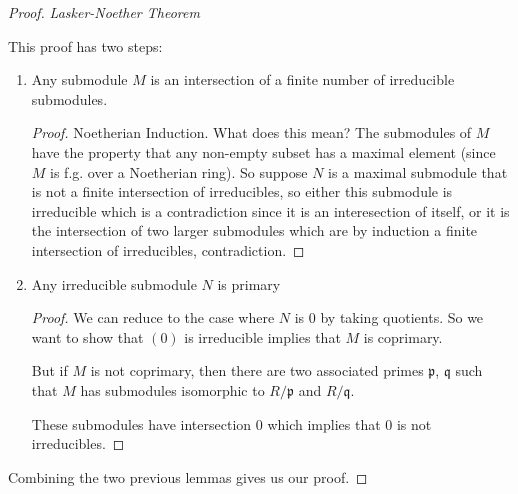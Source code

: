 \begin{proof}\textit{Lasker-Noether Theorem}
    
    This proof has two steps:\begin{enumerate}
        \item \begin{lemma}
            Any submodule $M$ is an intersection of a finite number of irreducible submodules.

            \begin{proof}
                Noetherian Induction. What does this mean? The submodules of $M$ have the property that any non-empty subset has a maximal element (since $M$ is f.g.  over a Noetherian ring).
            So suppose $N$ is a maximal submodule that is not a finite intersection of irreducibles, so either this submodule is irreducible which is a contradiction since it is an interesection of itself, or it is the intersection of two larger submodules which are by induction a finite intersection of irreducibles, contradiction.
            \end{proof}
        \end{lemma}
        \item \begin{lemma}
            Any irreducible submodule $N$ is primary
        \end{lemma}
        \begin{proof}
            We can reduce to the case where $N$ is $0$ by taking quotients. So we want to show that $(0)$ is irreducible implies that $M$ is coprimary.

            But if $M$ is not coprimary, then there are two associated primes $\mathfrak{p}$, $\mathfrak{q}$ such that $M$ has submodules isomorphic to $R/\mathfrak{p}$ and $R/\mathfrak{q}$.

            These submodules have intersection $0$ which implies that $0$ is not irreducibles.
        \end{proof}
    \end{enumerate}

    Combining the two previous lemmas gives us our proof.
\end{proof}
